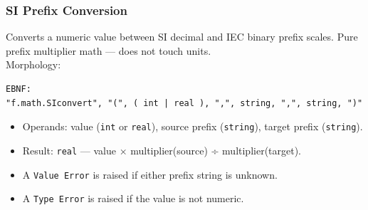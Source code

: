 \subsubsection{SI Prefix Conversion}
Converts a numeric value between SI decimal and IEC binary prefix scales. Pure prefix multiplier math — does not touch units. \\
Morphology:
\begin{verbatim}
EBNF:
"f.math.SIconvert", "(", ( int | real ), ",", string, ",", string, ")"
\end{verbatim}
\begin{itemize}
\item Operands: value (\texttt{int} or \texttt{real}), source prefix (\texttt{string}), target prefix (\texttt{string}).
\item Result: \texttt{real} — value × multiplier(source) ÷ multiplier(target).
\item A \texttt{Value Error} is raised if either prefix string is unknown.
\item A \texttt{Type Error} is raised if the value is not numeric.
\end{itemize}

